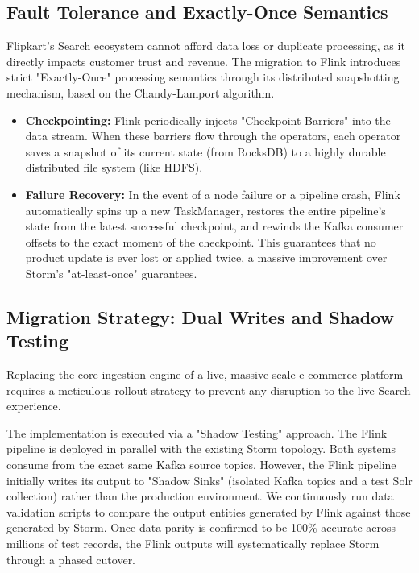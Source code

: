 \subsection{Fault Tolerance and Exactly-Once Semantics}
\begin{justify}
    Flipkart's Search ecosystem cannot afford data loss or duplicate processing, as it directly impacts customer trust and revenue. The migration to Flink introduces strict "Exactly-Once" processing semantics through its distributed snapshotting mechanism, based on the Chandy-Lamport algorithm.
    
    \begin{itemize}
        \item \textbf{Checkpointing:} Flink periodically injects "Checkpoint Barriers" into the data stream. When these barriers flow through the operators, each operator saves a snapshot of its current state (from RocksDB) to a highly durable distributed file system (like HDFS). 
        \item \textbf{Failure Recovery:} In the event of a node failure or a pipeline crash, Flink automatically spins up a new TaskManager, restores the entire pipeline's state from the latest successful checkpoint, and rewinds the Kafka consumer offsets to the exact moment of the checkpoint. This guarantees that no product update is ever lost or applied twice, a massive improvement over Storm's "at-least-once" guarantees.
    \end{itemize}
\end{justify}

\subsection{Migration Strategy: Dual Writes and Shadow Testing}
\begin{justify}
    Replacing the core ingestion engine of a live, massive-scale e-commerce platform requires a meticulous rollout strategy to prevent any disruption to the live Search experience.

    The implementation is executed via a "Shadow Testing" approach. The Flink pipeline is deployed in parallel with the existing Storm topology. Both systems consume from the exact same Kafka source topics. However, the Flink pipeline initially writes its output to "Shadow Sinks" (isolated Kafka topics and a test Solr collection) rather than the production environment. We continuously run data validation scripts to compare the output entities generated by Flink against those generated by Storm. Once data parity is confirmed to be 100\% accurate across millions of test records, the Flink outputs will systematically replace Storm through a phased cutover.
\end{justify}

